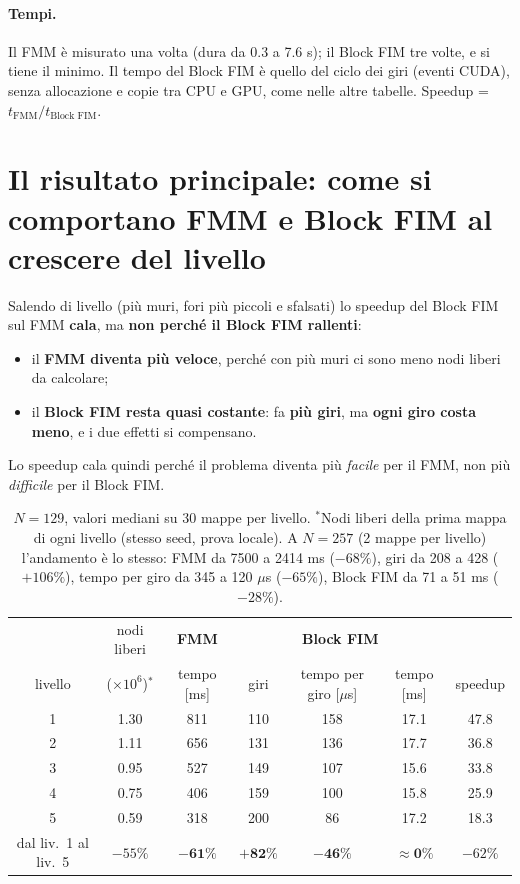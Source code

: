 \documentclass[11pt,a4paper]{article}
\begin{document}
\paragraph{Tempi.} Il FMM è misurato una volta (dura da 0.3 a 7.6 s); il Block FIM tre volte, e si tiene il minimo. Il tempo del Block FIM è quello del ciclo dei giri (eventi CUDA), senza allocazione e copie tra CPU e GPU, come nelle altre tabelle. Speedup = $t_\text{FMM}/t_\text{Block FIM}$.

\section{Il risultato principale: come si comportano FMM e Block FIM al crescere del livello}
\begin{tcolorbox}[colback=blue!4,colframe=blue!50!black,title=In sintesi]
Salendo di livello (più muri, fori più piccoli e sfalsati) lo speedup del Block FIM sul FMM \textbf{cala}, ma \textbf{non perché il Block FIM rallenti}:
\begin{itemize}
  \item il \textbf{FMM diventa più veloce}, perché con più muri ci sono meno nodi liberi da calcolare;
  \item il \textbf{Block FIM resta quasi costante}: fa \textbf{più giri}, ma \textbf{ogni giro costa meno}, e i due effetti si compensano.
\end{itemize}
Lo speedup cala quindi perché il problema diventa più \emph{facile} per il FMM, non più \emph{difficile} per il Block FIM.
\end{tcolorbox}

\begin{table}[H]
\centering
\small
\begin{tabular}{c|c|c|ccc|c}
\toprule
 & nodi liberi & \textbf{FMM} & \multicolumn{3}{c|}{\textbf{Block FIM}} & \\
livello & ($\times 10^6$)$^{*}$ & tempo [ms] & giri & tempo per giro [$\mu$s] & tempo [ms] & speedup \\
\midrule
1 & 1.30 & 811 & 110 & 158 & 17.1 & 47.8 \\
2 & 1.11 & 656 & 131 & 136 & 17.7 & 36.8 \\
3 & 0.95 & 527 & 149 & 107 & 15.6 & 33.8 \\
4 & 0.75 & 406 & 159 & 100 & 15.8 & 25.9 \\
5 & 0.59 & 318 & 200 & 86 & 17.2 & 18.3 \\
\midrule
dal liv.~1 al liv.~5 & $-55\%$ & $\mathbf{-61\%}$ & $\mathbf{+82\%}$ & $\mathbf{-46\%}$ & $\mathbf{\approx 0\%}$ & $-62\%$ \\
\bottomrule
\end{tabular}
\caption{$N=129$, valori mediani su 30 mappe per livello. $^{*}$Nodi liberi della prima mappa di ogni livello (stesso seed, prova locale). A $N=257$ (2 mappe per livello) l'andamento è lo stesso: FMM da 7500 a 2414 ms ($-68\%$), giri da 208 a 428 ($+106\%$), tempo per giro da 345 a 120 $\mu$s ($-65\%$), Block FIM da 71 a 51 ms ($-28\%$).}
\end{table}
\end{document}
